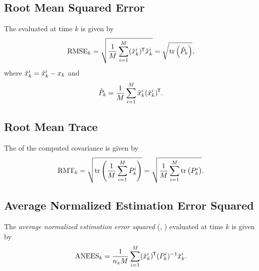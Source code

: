 \subsection{Root Mean Squared Error} \label{sec:rmse}

The \abbrRMSE evaluated at time $k$ is given by
\begin{equation}
	\text{RMSE}_k = \sqrt{ \frac{1}{M} \sum_{i=1}^M (\tilde{x}_k^i)^{\mkern-1.5mu\mathsf{T}}\tilde{x}_k^i} = \sqrt{\operatorname*{\rm tr}\left(\hat{P}_k \right)},
	\label{eq:def:rmse}
\end{equation}
where $\tilde{x}_k^i=\hat{x}_k^i-x_k$ and
\begin{equation}
	\hat{P}_k = \frac{1}{M}\sum_{i=1}^M \tilde{x}_k^i(\tilde{x}_k^i)^{\mkern-1.5mu\mathsf{T}}.
	\label{eq:def:sampled-covariance-of-estimation-error}
\end{equation}


\subsection{Root Mean Trace} \label{sec:rmt}

The \abbrRMT of the computed covariance is given by
\begin{equation}
	\text{RMT}_k = \sqrt{\operatorname*{\rm tr}\left(\frac{1}{M}\sum_{i=1}^M P_k^i\right)} = \sqrt{\frac{1}{M}\sum_{i=1}^M \operatorname*{\rm tr}\left(P_k^i\right)}.
	\label{eq:def:rmt}
\end{equation}


\subsection{Average Normalized Estimation Error Squared} \label{sec:anees}

The \emph{average normalized estimation error squared} (\abbrANEES, \cite{Li2006Fusion}) evaluated at time $k$ is given by
\begin{equation}
	\text{ANEES}_k = \frac{1}{n_x M} \sum_{i=1}^M (\tilde{x}_k^i)^{\mkern-1.5mu\mathsf{T}}(P_k^i)^{-1} \tilde{x}_k^i.
	\label{eq:def:anees}
\end{equation}


